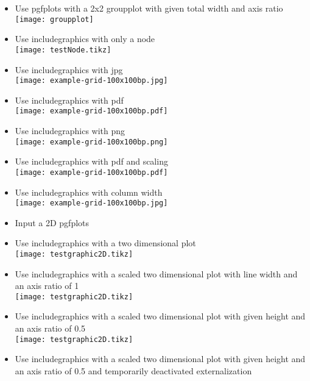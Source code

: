 \documentclass[twocolumn]{article}
\begin{document}
\begin{itemize}
		\item Use pgfplots with a 2x2 groupplot with given total width and axis ratio\\%
			\texttt{[image: groupplot]}
		\item Use includegraphics with only a node\\%
			\texttt{[image: testNode.tikz]}%
		\ifpdf
			\item Use includegraphics with jpg\\%
				\texttt{[image: example-grid-100x100bp.jpg]}%
			\item Use includegraphics with pdf\\%
				\texttt{[image: example-grid-100x100bp.pdf]}%
			\item Use includegraphics with png\\%
				\texttt{[image: example-grid-100x100bp.png]}%
			\item Use includegraphics with pdf and scaling\\%
				\texttt{[image: example-grid-100x100bp.pdf]}%
			\item Use includegraphics with column width\\%
				\texttt{[image: example-grid-100x100bp.jpg]}%
			\item Input a 2D pgfplots\\
			\item Use includegraphics with a two dimensional plot\\%
				\texttt{[image: testgraphic2D.tikz]}%
			\item Use includegraphics with a scaled two dimensional plot with line width and an axis ratio of 1\\%
				\texttt{[image: testgraphic2D.tikz]}%
			\item Use includegraphics with a scaled two dimensional plot with given height and an axis ratio of 0.5\\%
				\texttt{[image: testgraphic2D.tikz]}%
			\item Use includegraphics with a scaled two dimensional plot with given height and an axis ratio of 0.5 and temporarily deactivated externalization\\%

\end{itemize}
\end{document}
